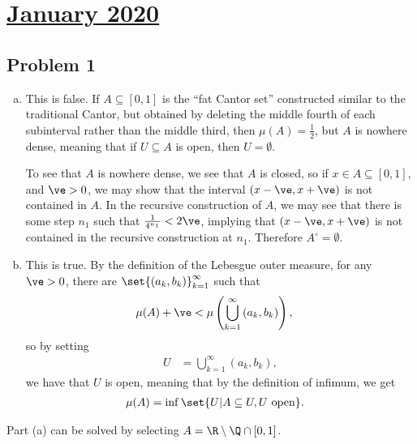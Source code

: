 \documentclass[10pt]{mypackage}
\begin{document}
\section{\href{https://math.virginia.edu/graduate/exams/analysis/2020Jan_real.pdf}{January 2020}}%
\subsection{Problem 1}%
\begin{enumerate}[(a)]
  \item This is false. If $A\subseteq [0,1]$ is the ``fat Cantor set'' constructed similar to the traditional Cantor, but obtained by deleting the middle fourth of each subinterval rather than the middle third, then $\mu(A) = \frac{1}{2}$, but $A$ is nowhere dense, meaning that if $U\subseteq A$ is open, then $U = \emptyset$.\newline

    To see that $A$ is nowhere dense, we see that $A$ is closed, so if $x\in A\subseteq [0,1]$, and $\ve > 0$, we may show that the interval $\left( x-\ve,x+\ve \right)$ is not contained in $A$. In the recursive construction of $A$, we may see that there is some step $n_1$ such that $\frac{1}{4^{n_1}} < 2\ve$, implying that $\left( x-\ve,x+\ve \right)$ is not contained in the recursive construction at $n_1$. Therefore $A^{\circ} = \emptyset$.
  \item This is true. By the definition of the Lebesgue outer measure, for any $\ve > 0$, there are $\set{\left( a_k,b_k \right)}_{k=1}^{\infty}$ such that
    \begin{align*}
      \mu(A) + \ve &< \mu\left( \bigcup_{k=1}^{\infty}\left( a_k,b_k \right) \right),
    \end{align*}
    so by setting
    \begin{align*}
      U &= \bigcup_{k=1}^{\infty}\left( a_k,b_k \right),
    \end{align*}
    we have that $U$ is open, meaning that by the definition of infimum, we get 
    \begin{align*}
      \mu(A) &= \inf\set{U | A\subseteq U,U\text{ open}}.
    \end{align*}
\end{enumerate}
\begin{remark}
  Part (a) can be solved by selecting $A = \R\setminus \Q\cap [0,1]$.
\end{remark}
\end{document}
